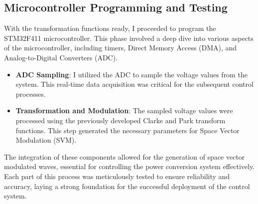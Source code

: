 \subsection{Microcontroller Programming and Testing}
With the transformation functions ready, I proceeded to program the STM32F411
microcontroller. This phase involved a deep dive into various aspects of the
microcontroller, including timers, Direct Memory Access (DMA), and
Analog-to-Digital Converters (ADC).
\begin{itemize}
    \item \textbf{ADC Sampling}: I utilized the ADC to sample the voltage values from the system. This real-time data acquisition was critical for the subsequent control processes.
    \item \textbf{Transformation and Modulation}: The sampled voltage values were processed using the previously developed Clarke and Park transform functions. This step generated the necessary parameters for Space Vector Modulation (SVM).
\end{itemize}
\noindent
The integration of these components allowed for the generation of space vector
modulated waves, essential for controlling the power conversion system
effectively. Each part of this process was meticulously tested to ensure
reliability and accuracy, laying a strong foundation for the successful
deployment of the control system.